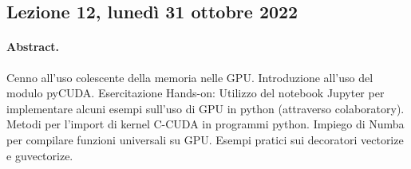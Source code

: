 \subsection{Lezione 12, lunedì 31 ottobre 2022}

\paragraph{Abstract.} Cenno all'uso colescente della memoria nelle GPU. Introduzione all'uso del modulo pyCUDA. Esercitazione Hands-on: Utilizzo del notebook Jupyter per implementare alcuni esempi sull'uso di GPU in python (attraverso colaboratory). Metodi per l'import di kernel C-CUDA in programmi python. Impiego di Numba per compilare funzioni universali su GPU. Esempi pratici sui decoratori vectorize e guvectorize.